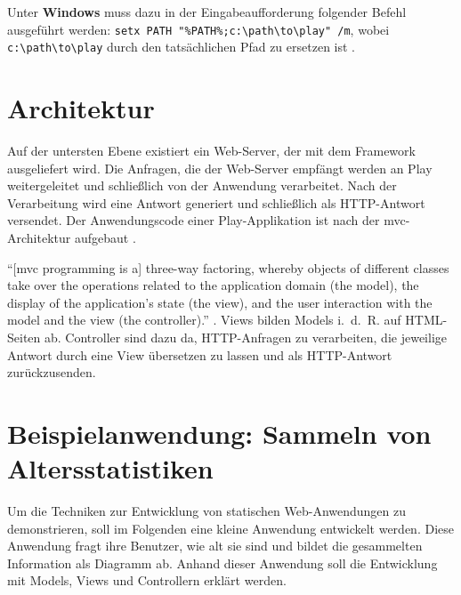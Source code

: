 Unter \textbf{Windows} muss dazu in der Eingabeaufforderung folgender Befehl ausgeführt werden: \lstinline|setx PATH "%PATH%;c:\path\to\play" /m|, wobei \lstinline|c:\path\to\play| durch den tatsächlichen Pfad zu ersetzen ist \cite[vgl.][S.~9]{play_for_scala_v8}.



\section{Architektur} %
\label{sec:architektur}

Auf der untersten Ebene existiert ein Web-Server, der mit dem Framework ausgeliefert wird.
Die Anfragen, die der Web-Server empfängt werden an Play weitergeleitet und schließlich von der Anwendung verarbeitet.
Nach der Verarbeitung wird eine Antwort generiert und schließlich als HTTP-Antwort versendet.
Der Anwendungscode einer Play-Applikation ist nach der \gls{mvc}-Architektur aufgebaut \cite[vgl.][S.~51-53]{play_for_scala_v8}.

"`[\gls{mvc} programming is a] three-way factoring, whereby objects of different classes take over the operations related to the application domain (the model), the display of the application's state (the view), and the user interaction with the model and the view (the controller)."' \cite[vgl.][S.~1]{mvc}.
Views bilden Models i.~d.~R. auf HTML-Seiten ab.
Controller sind dazu da, HTTP-Anfragen zu verarbeiten, die jeweilige Antwort durch eine View übersetzen zu lassen und als HTTP-Antwort zurückzusenden.





\section{Beispielanwendung: Sammeln von Altersstatistiken} %
\label{sec:beispielanwendung}

Um die Techniken zur Entwicklung von statischen Web-Anwendungen zu demonstrieren, soll im Folgenden eine kleine Anwendung entwickelt werden.
Diese Anwendung fragt ihre Benutzer, wie alt sie sind und bildet die gesammelten Information als Diagramm ab.
Anhand dieser Anwendung soll die Entwicklung mit Models, Views und Controllern erklärt werden.



